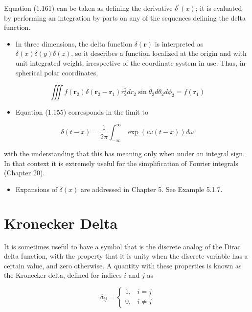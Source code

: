 \documentclass[10pt]{article}
\begin{document}
Equation (1.161) can be taken as defining the derivative $\delta^{\prime}(x)$; it is evaluated by performing an integration by parts on any of the sequences defining the delta function.

\begin{itemize}
  \item In three dimensions, the delta function $\delta(\mathbf{r})$ is interpreted as $\delta(x) \delta(y) \delta(z)$, so it describes a function localized at the origin and with unit integrated weight, irrespective of the coordinate system in use. Thus, in spherical polar coordinates,
\end{itemize}


\begin{equation*}
\iiint f\left(\mathbf{r}_{2}\right) \delta\left(\mathbf{r}_{2}-\mathbf{r}_{1}\right) r_{2}^{2} d r_{2} \sin \theta_{2} d \theta_{2} d \phi_{2}=f\left(\mathbf{r}_{1}\right) \tag{1.162}
\end{equation*}


\begin{itemize}
  \item Equation (1.155) corresponds in the limit to
\end{itemize}


\begin{equation*}
\delta(t-x)=\frac{1}{2 \pi} \int_{-\infty}^{\infty} \exp (i \omega(t-x)) d \omega \tag{1.163}
\end{equation*}


with the understanding that this has meaning only when under an integral sign. In that context it is extremely useful for the simplification of Fourier integrals (Chapter 20).

\begin{itemize}
  \item Expansions of $\delta(x)$ are addressed in Chapter 5. See Example 5.1.7.
\end{itemize}

\section*{Kronecker Delta}
It is sometimes useful to have a symbol that is the discrete analog of the Dirac delta function, with the property that it is unity when the discrete variable has a certain value, and zero otherwise. A quantity with these properties is known as the Kronecker delta, defined for indices $i$ and $j$ as

\[
\delta_{i j}= \begin{cases}1, & i=j  \tag{1.164}\\ 0, & i \neq j\end{cases}
\]
\end{document}
